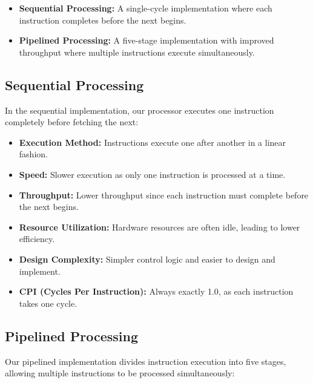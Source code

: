 \documentclass[conference]{IEEEtran}
\begin{document}
\begin{itemize}
    \item \textbf{Sequential Processing:} A single-cycle implementation where each instruction completes before the next begins.
    
    \item \textbf{Pipelined Processing:} A five-stage implementation with improved throughput where multiple instructions execute simultaneously.
\end{itemize}

\subsection{Sequential Processing}
In the sequential implementation, our processor executes one instruction completely before fetching the next:

\begin{itemize}
    \item \textbf{Execution Method:} Instructions execute one after another in a linear fashion.
    
    \item \textbf{Speed:} Slower execution as only one instruction is processed at a time.
    
    \item \textbf{Throughput:} Lower throughput since each instruction must complete before the next begins.
    
    \item \textbf{Resource Utilization:} Hardware resources are often idle, leading to lower efficiency.
    
    \item \textbf{Design Complexity:} Simpler control logic and easier to design and implement.
    
    \item \textbf{CPI (Cycles Per Instruction):} Always exactly 1.0, as each instruction takes one cycle.
\end{itemize}

\subsection{Pipelined Processing}
Our pipelined implementation divides instruction execution into five stages, allowing multiple instructions to be processed simultaneously:
\end{document}
